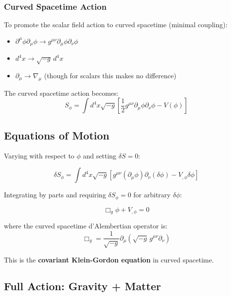 \documentclass[11pt,a4paper]{article}
\begin{document}
\subsubsection{Curved Spacetime Action}

To promote the scalar field action to curved spacetime (minimal coupling):

\begin{itemize}
\item $\partial^\mu \phi \partial_\mu \phi \to g^{\mu\nu} \partial_\mu \phi \partial_\nu \phi$
\item $d^4x \to \sqrt{-g} \, d^4x$
\item $\partial_\mu \to \nabla_\mu$ (though for scalars this makes no difference)
\end{itemize}

The curved spacetime action becomes:
\begin{equation}
\boxed{S_\phi = \int d^4x \sqrt{-g} \left[ \frac{1}{2} g^{\mu\nu} \partial_\mu \phi \partial_\nu \phi - V(\phi) \right]}
\end{equation}

\subsection{Equations of Motion}

Varying with respect to $\phi$ and setting $\delta S = 0$:

\begin{equation}
\delta S_\phi = \int d^4x \sqrt{-g} \left[ g^{\mu\nu} (\partial_\mu \phi) \partial_\nu (\delta\phi) - V_{,\phi} \delta\phi \right]
\end{equation}

Integrating by parts and requiring $\delta S_\phi = 0$ for arbitrary $\delta\phi$:

\begin{equation}
\boxed{\Box_g \phi + V_{,\phi} = 0}
\end{equation}

where the curved spacetime d'Alembertian operator is:
\begin{equation}
\Box_g = \frac{1}{\sqrt{-g}} \partial_\mu \left(\sqrt{-g} \, g^{\mu\nu} \partial_\nu\right)
\end{equation}

This is the \textbf{covariant Klein-Gordon equation} in curved spacetime.

\subsection{Full Action: Gravity + Matter}
\end{document}
